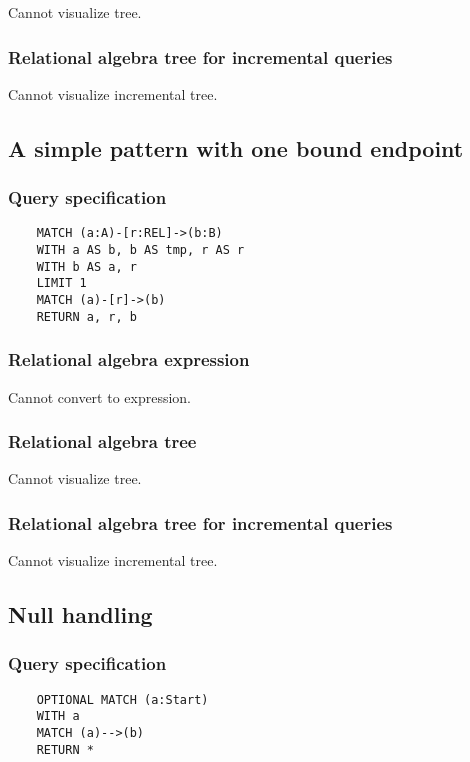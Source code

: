 	Cannot visualize tree.

	\subsubsection*{Relational algebra tree for incremental queries}

	Cannot visualize incremental tree.
	\subsection{A simple pattern with one bound endpoint}

	\subsubsection*{Query specification}

	\begin{lstlisting}
	MATCH (a:A)-[r:REL]->(b:B)
	WITH a AS b, b AS tmp, r AS r
	WITH b AS a, r
	LIMIT 1
	MATCH (a)-[r]->(b)
	RETURN a, r, b
	\end{lstlisting}


	\subsubsection*{Relational algebra expression}

	Cannot convert to expression.

	\subsubsection*{Relational algebra tree}

	Cannot visualize tree.

	\subsubsection*{Relational algebra tree for incremental queries}

	Cannot visualize incremental tree.
	\subsection{Null handling}

	\subsubsection*{Query specification}

	\begin{lstlisting}
	OPTIONAL MATCH (a:Start)
	WITH a
	MATCH (a)-->(b)
	RETURN *
	\end{lstlisting}


